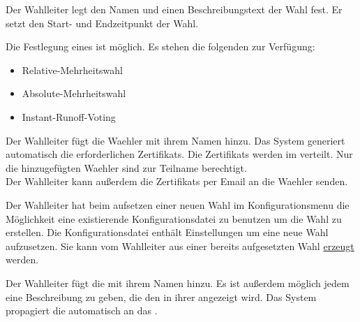 \documentclass[parskip=full,11pt,twoside]{scrartcl}
\begin{document}
Der \gls{Wahlleiter} legt den Namen und einen Beschreibungstext der \gls{Wahl} fest.
Er setzt den Start- und Endzeitpunkt der \gls{Wahl}.

\pagebreak

Die Festlegung eines  ist möglich. Es stehen die folgenden zur Verfügung:
\begin{itemize}
	\item \gls{Relative-Mehrheitswahl}
	\item \gls{Absolute-Mehrheitswahl}
	\item \gls{Instant-Runoff-Voting}
\end{itemize}

Der \gls{Wahlleiter} fügt die \gls{Waehler} mit ihrem Namen hinzu. Das System generiert automatisch die erforderlichen \glspl{Zertifikat}. Die \glspl{Zertifikat} werden im  verteilt. Nur die hinzugefügten \gls{Waehler} sind zur Teilname berechtigt. \\
Der \gls{Wahlleiter} kann außerdem die \glspl{Zertifikat} per Email an die \gls{Waehler} senden.

Der \gls{Wahlleiter} hat beim aufsetzen einer neuen \gls{Wahl} im \gls{Konfigurationsmenu} die Möglichkeit eine existierende Konfigurationsdatei zu benutzen um die \gls{Wahl} zu erstellen.
Die Konfigurationsdatei enthält Einstellungen um eine neue \gls{Wahl} aufzusetzen. Sie kann vom \gls{Wahlleiter} aus einer bereits aufgesetzten \gls{Wahl} \hyperref[fnc:export]{erzeugt} werden.

Der \gls{Wahlleiter} fügt die  mit ihrem Namen hinzu. Es ist außerdem möglich jedem  eine Beschreibung zu geben, die den  in ihrer  angezeigt wird. Das System propagiert die  automatisch an das .
\end{document}
